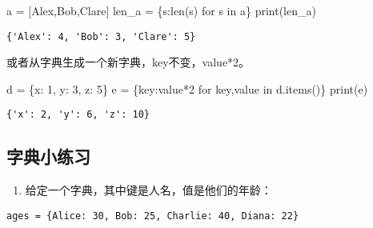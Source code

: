 \documentclass[
  letterpaper,
  DIV=11,
  numbers=noendperiod]{scrreprt}
\newenvironment{Shaded}{\begin{snugshade}}{\end{snugshade}}
\newcommand{\BuiltInTok}[1]{\textcolor[rgb]{0.00,0.23,0.31}{#1}}
\newcommand{\ControlFlowTok}[1]{\textcolor[rgb]{0.00,0.23,0.31}{#1}}
\newcommand{\DecValTok}[1]{\textcolor[rgb]{0.68,0.00,0.00}{#1}}
\newcommand{\KeywordTok}[1]{\textcolor[rgb]{0.00,0.23,0.31}{#1}}
\newcommand{\NormalTok}[1]{\textcolor[rgb]{0.00,0.23,0.31}{#1}}
\newcommand{\OperatorTok}[1]{\textcolor[rgb]{0.37,0.37,0.37}{#1}}
\newcommand{\StringTok}[1]{\textcolor[rgb]{0.13,0.47,0.30}{#1}}
\providecommand{\tightlist}{%
  \setlength{\itemsep}{0pt}\setlength{\parskip}{0pt}}\usepackage{longtable,booktabs,array}
\begin{document}
\begin{Shaded}
\begin{Highlighting}[]
\NormalTok{a }\OperatorTok{=}\NormalTok{ [}\StringTok{\textquotesingle{}Alex\textquotesingle{}}\NormalTok{,}\StringTok{\textquotesingle{}Bob\textquotesingle{}}\NormalTok{,}\StringTok{\textquotesingle{}Clare\textquotesingle{}}\NormalTok{]}
\NormalTok{len\_a }\OperatorTok{=}\NormalTok{ \{s:}\BuiltInTok{len}\NormalTok{(s) }\ControlFlowTok{for}\NormalTok{ s }\KeywordTok{in}\NormalTok{ a\}}
\BuiltInTok{print}\NormalTok{(len\_a)}
\end{Highlighting}
\end{Shaded}

\begin{verbatim}
{'Alex': 4, 'Bob': 3, 'Clare': 5}
\end{verbatim}

或者从字典生成一个新字典，key不变，value*2。

\begin{Shaded}
\begin{Highlighting}[]
\NormalTok{d }\OperatorTok{=}\NormalTok{ \{}\StringTok{\textquotesingle{}x\textquotesingle{}}\NormalTok{: }\DecValTok{1}\NormalTok{, }\StringTok{\textquotesingle{}y\textquotesingle{}}\NormalTok{: }\DecValTok{3}\NormalTok{, }\StringTok{\textquotesingle{}z\textquotesingle{}}\NormalTok{: }\DecValTok{5}\NormalTok{\}}
\NormalTok{e }\OperatorTok{=}\NormalTok{ \{key:value}\OperatorTok{*}\DecValTok{2} \ControlFlowTok{for}\NormalTok{ key,value }\KeywordTok{in}\NormalTok{ d.items()\}}
\BuiltInTok{print}\NormalTok{(e)}
\end{Highlighting}
\end{Shaded}

\begin{verbatim}
{'x': 2, 'y': 6, 'z': 10}
\end{verbatim}

\hypertarget{ux5b57ux5178ux5c0fux7ec3ux4e60}{%
\subsection{字典小练习}\label{ux5b57ux5178ux5c0fux7ec3ux4e60}}

\begin{enumerate}
\def\labelenumi{\arabic{enumi}.}
\tightlist
\item
  给定一个字典，其中键是人名，值是他们的年龄：
\end{enumerate}

\texttt{ages\ =\ \{\textquotesingle{}Alice\textquotesingle{}:\ 30,\ \textquotesingle{}Bob\textquotesingle{}:\ 25,\ \textquotesingle{}Charlie\textquotesingle{}:\ 40,\ \textquotesingle{}Diana\textquotesingle{}:\ 22\}}
\end{document}
